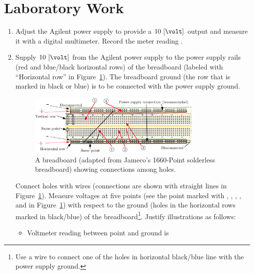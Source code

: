 \section{Laboratory Work}
\begin{enumerate}

\item  Adjust the Agilent power supply to provide a $10~[\volt]$ output and measure it with a digital multimeter.  Record the meter reading \underline{\hspace{2.0 cm}}. 
  
\item Supply $10~[\volt]$ from the Agilent power supply to the power supply
  rails (red and blue/black horizontal rows) of the breadboard (labeled with
  ``Horizontal row'' in Figure~\ref{fig:jameco25-Breadboard}). The breadboard
  ground (the row that is marked in black or blue) is to be connected with the
  power supply ground. %
\begin{figure}
    \centering
    \includegraphics[width=0.8\textwidth]{figs/ipe/lab1/breadboardLayout}
    \caption{A breadboard (adapted from Jameco's 1660-Point solderless breadboard) showing connections among holes.}
    \label{fig:jameco25-Breadboard}
\end{figure}  
%
Connect holes with wires (connections are shown with straight lines in
Figure~\ref{fig:jameco25-Breadboard}). Measure voltages at five points (see the
point marked with ,
,
,
, and
 in
Figure~\ref{fig:jameco25-Breadboard}) with respect to the ground (holes in the
horizontal rows marked
in black/blue) of the
breadboard\footnote{Use a wire to connect one of the holes in horizontal
  black/blue line with the power supply ground.}. Justify illustrations as follows: %
%
\begin{itemize}
\item Voltmeter reading between point
   and ground is

\end{itemize}
\end{enumerate}
